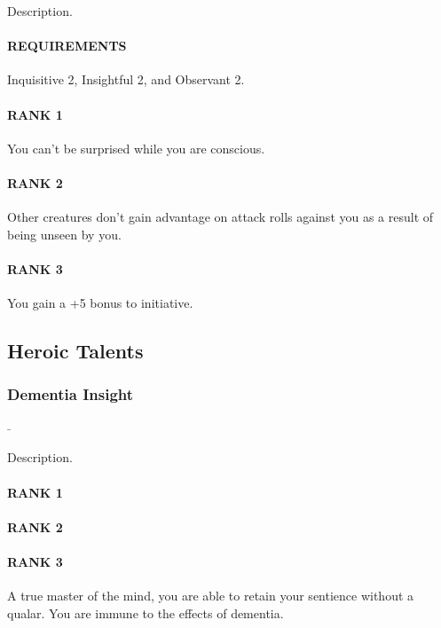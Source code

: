 \normalsize
Description.
\paragraph{REQUIREMENTS} Inquisitive 2, Insightful 2, and Observant 2.
\paragraph{RANK 1} You can't be surprised while you are conscious.
\paragraph{RANK 2} Other creatures don't gain advantage on attack rolls against you as a result of being unseen by you.
\paragraph{RANK 3} You gain a +5 bonus to initiative.

\subsection*{Heroic Talents}
\subsubsection{Dementia Insight} \label{tal::dementiainsight}
\small{\textcolor{gray}{-}}

\normalsize
Description.
\paragraph{RANK 1}
\paragraph{RANK 2}
\paragraph{RANK 3} A true master of the mind, you are able to retain your sentience without a qualar.
You are immune to the effects of dementia.
